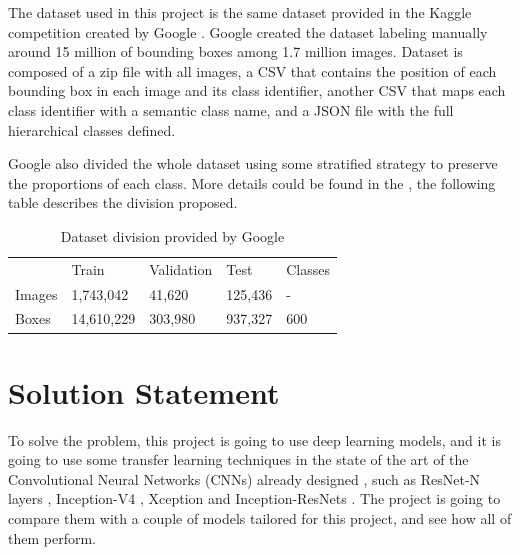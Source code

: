 \documentclass[11pt, a4paper, twocolumn]{article}
\begin{document}
The dataset used in this project is the same dataset provided in the Kaggle competition created by Google \cite{kaggle}. Google created the dataset labeling manually around 15 million of bounding boxes among 1.7 million images. Dataset is composed of a zip file with all images, a CSV that contains the position of each bounding box in each image and its class identifier, another CSV that maps each class identifier with a semantic class name, and a JSON file with the full hierarchical classes defined.

Google also divided the whole dataset using some stratified strategy to preserve the proportions of each class. More details could be found in the \cite{imgdataset}, the following table describes the division proposed.

\begin{table}[ht]
	\footnotesize
	\centering
	\caption{ \small Dataset division provided by Google }
	\label{table1}
	\begin{tabular}{@{}p{1.5cm}p{1.5cm}p{1.5cm}p{1.5cm}p{1.2cm}@{}}
		\rowcolor[HTML]{EFEFEF}
		& \multicolumn{1}{l}{\cellcolor[HTML]{EFEFEF}Train} & \multicolumn{1}{l}{\cellcolor[HTML]{EFEFEF}Validation} & \multicolumn{1}{l}{\cellcolor[HTML]{EFEFEF}Test} & \multicolumn{1}{l}{\cellcolor[HTML]{EFEFEF}Classes} \\
		Images & 1,743,042                                         & 41,620                                                 & 125,436                                          & -                                                      \\
		Boxes  & 14,610,229                                        & 303,980                                                & 937,327                                          & 600                                                    \\
	\end{tabular}
\end{table}

\section{Solution Statement}

To solve the problem, this project is going to use deep learning models, and it is going to use some transfer learning techniques in the state of the art of the Convolutional Neural Networks (CNNs) already designed \cite{cnns}, such as ResNet-N layers \cite{resnet}, Inception-V4 \cite{inception}, Xception \cite{xception} and Inception-ResNets \cite{inception}. The project is going to compare them with a couple of models tailored for this project, and see how all of them perform.
\end{document}

